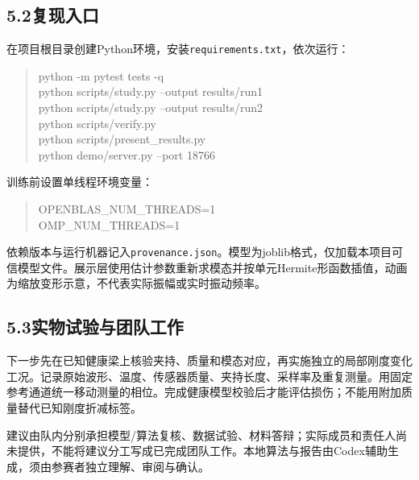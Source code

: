 \documentclass[UTF8,a4paper,11pt,fontset=fandol]{ctexart}
\begin{document}
\subsection*{5.2\quad 复现入口}
在项目根目录创建Python环境，安装\texttt{requirements.txt}，依次运行：
\begin{quote}\ttfamily\small
python -m pytest tests -q\\
python scripts/study.py --output results/run1\\
python scripts/study.py --output results/run2\\
python scripts/verify.py\\
python scripts/present\_results.py\\
python demo/server.py --port 18766
\end{quote}
训练前设置单线程环境变量：
\begin{quote}\ttfamily\small OPENBLAS\_NUM\_THREADS=1\\OMP\_NUM\_THREADS=1\end{quote}
依赖版本与运行机器记入\texttt{provenance.json}。模型为joblib格式，仅加载本项目可信模型文件。展示层使用估计参数重新求模态并按单元Hermite形函数插值，动画为缩放变形示意，不代表实际振幅或实时振动频率。
\subsection*{5.3\quad 实物试验与团队工作}
下一步先在已知健康梁上核验夹持、质量和模态对应，再实施独立的局部刚度变化工况。记录原始波形、温度、传感器质量、夹持长度、采样率及重复测量。用固定参考通道统一移动测量的相位。完成健康模型校验后才能评估损伤；不能用附加质量替代已知刚度折减标签。

建议由队内分别承担模型/算法复核、数据试验、材料答辩；实际成员和责任人尚未提供，不能将建议分工写成已完成团队工作。本地算法与报告由Codex辅助生成，须由参赛者独立理解、审阅与确认。
\newpage
\end{document}
